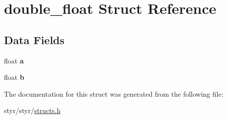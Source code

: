 \hypertarget{structdouble__float}{}\section{double\+\_\+float Struct Reference}
\label{structdouble__float}
\subsection*{Data Fields}
\begin{DoxyCompactItemize}
\item 
float {\bfseries a}\hypertarget{structdouble__float_a4aec1a5be9d9a4a394a2e49e9744286e}{}\label{structdouble__float_a4aec1a5be9d9a4a394a2e49e9744286e}

\item 
float {\bfseries b}\hypertarget{structdouble__float_a83fc1af92e29717b4513d121b0c72c7d}{}\label{structdouble__float_a83fc1af92e29717b4513d121b0c72c7d}

\end{DoxyCompactItemize}


The documentation for this struct was generated from the following file\+:\begin{DoxyCompactItemize}
\item 
styr/styr/\hyperlink{structs_8h}{structs.\+h}\end{DoxyCompactItemize}
